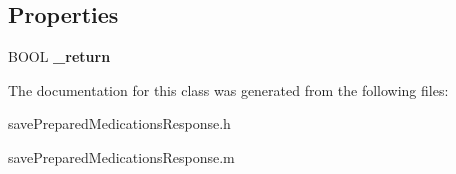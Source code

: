 \subsection*{Properties}
\begin{DoxyCompactItemize}
\item 
\hypertarget{interfacesave_prepared_medications_response_a4a6ef313d4211a4be1e44953d08c151a}{}B\+O\+O\+L {\bfseries \+\_\+return}\label{interfacesave_prepared_medications_response_a4a6ef313d4211a4be1e44953d08c151a}

\end{DoxyCompactItemize}


The documentation for this class was generated from the following files\+:\begin{DoxyCompactItemize}
\item 
save\+Prepared\+Medications\+Response.\+h\item 
save\+Prepared\+Medications\+Response.\+m\end{DoxyCompactItemize}

